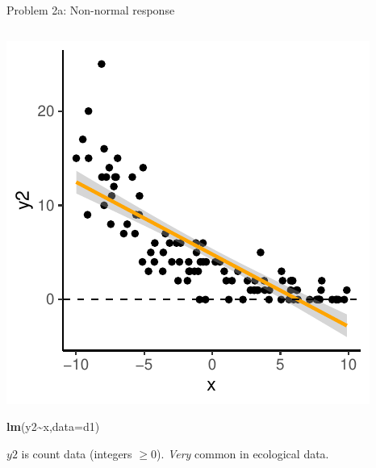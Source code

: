 \documentclass[
  ignorenonframetext,
  aspectratio=169]{beamer}
\newenvironment{Shaded}{\begin{snugshade}}{\end{snugshade}}
\newcommand{\AttributeTok}[1]{\textcolor[rgb]{0.13,0.29,0.53}{#1}}
\newcommand{\FunctionTok}[1]{\textcolor[rgb]{0.13,0.29,0.53}{\textbf{#1}}}
\newcommand{\NormalTok}[1]{#1}
\newcommand{\SpecialCharTok}[1]{\textcolor[rgb]{0.81,0.36,0.00}{\textbf{#1}}}
\let\oldShaded\Shaded %
\let\endoldShaded\endShaded
\renewenvironment{Shaded}{\scriptsize\oldShaded}{\endoldShaded}
\begin{document}
\begin{frame}[fragile]{Problem 2a: Non-normal response}
\protect\hypertarget{problem-2a-non-normal-response}{}
\begin{columns}[T]
\begin{column}{0.48\textwidth}
\includegraphics{03-Lecture_files/figure-beamer/unnamed-chunk-33-1.pdf}

\begin{Shaded}
\begin{Highlighting}[]
\FunctionTok{lm}\NormalTok{(y2}\SpecialCharTok{\textasciitilde{}}\NormalTok{x,}\AttributeTok{data=}\NormalTok{d1)}
\end{Highlighting}
\end{Shaded}

\(y2\) is count data (integers \(\geq{0}\)). \emph{Very} common in
ecological data.
\end{column}


\end{columns}
\end{frame}
\end{document}
